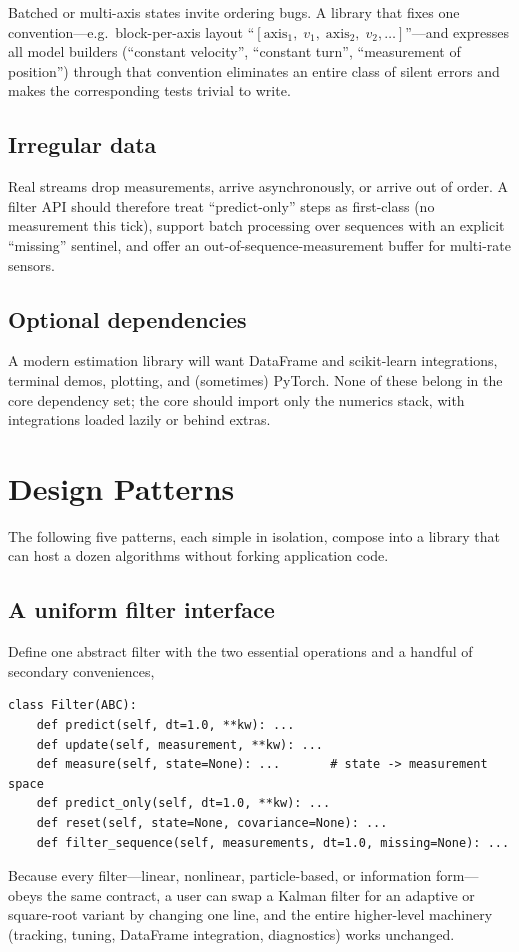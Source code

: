 \documentclass[10pt,conference]{IEEEtran}
\begin{document}
Batched or multi-axis states invite ordering bugs. A library that fixes one
convention---e.g.\ block-per-axis layout ``$[\text{axis}_1,\; v_1,\;
\text{axis}_2,\; v_2,\ldots]$''---and expresses all model builders
(``constant velocity'', ``constant turn'', ``measurement of position'')
through that convention eliminates an entire class of silent errors and makes
the corresponding tests trivial to write.

\subsection{Irregular data}

Real streams drop measurements, arrive asynchronously, or arrive out of order.
A filter API should therefore treat ``predict-only'' steps as first-class
(no measurement this tick), support batch processing over sequences with an
explicit ``missing'' sentinel, and offer an out-of-sequence-measurement buffer
for multi-rate sensors.

\subsection{Optional dependencies}

A modern estimation library will want DataFrame and scikit-learn
integrations, terminal demos, plotting, and (sometimes) PyTorch. None of
these belong in the core dependency set; the core should import only the
numerics stack, with integrations loaded lazily or behind extras.

\section{Design Patterns}
\label{sec:patterns}

The following five patterns, each simple in isolation, compose into a library
that can host a dozen algorithms without forking application code.

\subsection{A uniform filter interface}

Define one abstract filter with the two essential operations and a handful of
secondary conveniences,
\begin{lstlisting}
class Filter(ABC):
    def predict(self, dt=1.0, **kw): ...
    def update(self, measurement, **kw): ...
    def measure(self, state=None): ...       # state -> measurement space
    def predict_only(self, dt=1.0, **kw): ...
    def reset(self, state=None, covariance=None): ...
    def filter_sequence(self, measurements, dt=1.0, missing=None): ...
\end{lstlisting}
Because every filter---linear, nonlinear, particle-based, or information
form---obeys the same contract, a user can swap a Kalman filter for an
adaptive or square-root variant by changing one line, and the entire
higher-level machinery (tracking, tuning, DataFrame integration, diagnostics)
works unchanged.
\end{document}
